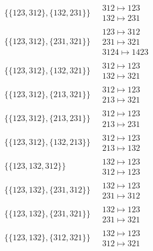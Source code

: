 \begin{scriptsize}
\begin{align}
\\
\{\{123, 312\}, \{132, 231\}\}
\ 
&
\begin{matrix}
312 \mapsto 123\\132 \mapsto 231
\end{matrix}
\\
\{\{123, 312\}, \{231, 321\}\}
\ 
&
\begin{matrix}
123 \mapsto 312\\231 \mapsto 321\\3124 \mapsto 1423
\end{matrix}
\\
\{\{123, 312\}, \{132, 321\}\}
\ 
&
\begin{matrix}
312 \mapsto 123\\132 \mapsto 321
\end{matrix}
\\
\{\{123, 312\}, \{213, 321\}\}
\ 
&
\begin{matrix}
312 \mapsto 123\\213 \mapsto 321
\end{matrix}
\\
\{\{123, 312\}, \{213, 231\}\}
\ 
&
\begin{matrix}
312 \mapsto 123\\213 \mapsto 231
\end{matrix}
\\
\{\{123, 312\}, \{132, 213\}\}
\ 
&
\begin{matrix}
312 \mapsto 123\\213 \mapsto 132
\end{matrix}
\\
\{\{123, 132, 312\}\}
\ 
&
\begin{matrix}
132 \mapsto 123\\312 \mapsto 123
\end{matrix}
\\
\{\{123, 132\}, \{231, 312\}\}
\ 
&
\begin{matrix}
132 \mapsto 123\\231 \mapsto 312
\end{matrix}
\\
\{\{123, 132\}, \{231, 321\}\}
\ 
&
\begin{matrix}
132 \mapsto 123\\231 \mapsto 321
\end{matrix}
\\
\{\{123, 132\}, \{312, 321\}\}
\ 
&
\begin{matrix}
132 \mapsto 123\\312 \mapsto 321
\end{matrix}

\end{align}
\end{scriptsize}
